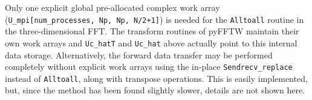 \documentclass[final,3p,times,twocolumn]{elsarticle}
\newcommand{\inpyth}{\lstinline[style=inlinestyle]} %[]%
\begin{document}
Only one explicit global pre-allocated complex work array 
(\inpyth{U_mpi[num_processes, Np, Np, N/2+1]}) is needed for the 
\inpyth{Alltoall} routine in the three-dimensional FFT. The transform routines 
of pyFFTW maintain their own work arrays and \inpyth{Uc_hatT} and 
\inpyth{Uc_hat} above actually point to this internal data storage. 
Alternatively, the forward data transfer may be 
performed completely without explicit work arrays using the in-place 
\inpyth{Sendrecv_replace} instead of \inpyth{Alltoall}, along with transpose 
operations. This is easily implemented, but, since the method has been found 
slightly slower, details are not shown here.

\begin{figure}[th!]
\centering
{}
\end{figure}
\end{document}
